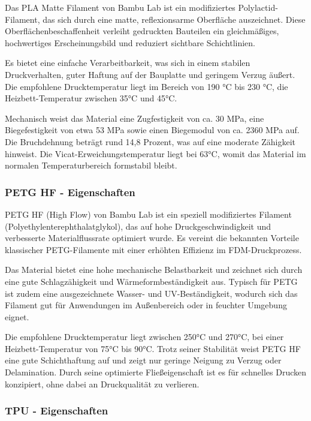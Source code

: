 \documentclass[a4paper,12pt]{article}
\begin{document}
Das PLA Matte Filament von Bambu Lab ist ein modifiziertes Polylactid-Filament, das sich durch eine matte, reflexionsarme Oberfläche auszeichnet. Diese Oberflächenbeschaffenheit verleiht gedruckten Bauteilen ein gleichmäßiges, hochwertiges Erscheinungsbild und reduziert sichtbare Schichtlinien.

Es bietet eine einfache Verarbeitbarkeit, was sich in einem stabilen Druckverhalten, guter Haftung auf der Bauplatte und geringem Verzug äußert. Die empfohlene Drucktemperatur liegt im Bereich von 190 °C bis 230 °C, die Heizbett-Temperatur zwischen 35°C und 45°C.

Mechanisch weist das Material eine Zugfestigkeit von ca. 30 MPa, eine Biegefestigkeit von etwa 53 MPa sowie einen Biegemodul von ca. 2360 MPa auf. Die Bruchdehnung beträgt rund 14,8 Prozent, was auf eine moderate Zähigkeit hinweist. \newline Die Vicat-Erweichungstemperatur liegt bei 63°C, womit das Material im normalen Temperaturbereich formstabil bleibt.\cite{Bambu_Lab_Filament_PLA}


\subsubsection{PETG HF - Eigenschaften}

PETG HF (High Flow) von Bambu Lab ist ein speziell modifiziertes Filament (Polyethylenterephthalatglykol), das auf hohe Druckgeschwindigkeit und verbesserte Materialflussrate optimiert wurde. Es vereint die bekannten Vorteile klassischer PETG-Filamente mit einer erhöhten Effizienz im FDM-Druckprozess.

Das Material bietet eine hohe mechanische Belastbarkeit und zeichnet sich durch eine gute Schlagzähigkeit und Wärmeformbeständigkeit aus. Typisch für PETG ist zudem eine ausgezeichnete Wasser- und UV-Beständigkeit, wodurch sich das Filament gut für Anwendungen im Außenbereich oder in feuchter Umgebung eignet.

Die empfohlene Drucktemperatur liegt zwischen 250°C und 270°C, bei einer Heizbett-Temperatur von 75°C bis 90°C. Trotz seiner Stabilität weist PETG HF eine gute Schichthaftung auf und zeigt nur geringe Neigung zu Verzug oder Delamination. Durch seine optimierte Fließeigenschaft ist es für schnelles Drucken konzipiert, ohne dabei an Druckqualität zu verlieren.\cite{Bambu_Lab_Filament_PETG_HF}\newline

\newpage

\subsubsection{TPU - Eigenschaften}
\end{document}
